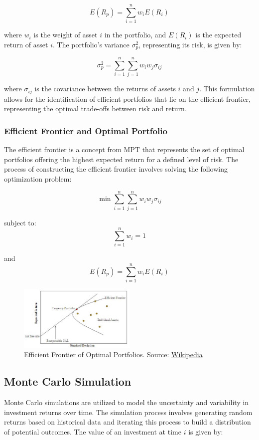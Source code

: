 \[
E(R_p) = \sum_{i=1}^{n} w_i E(R_i)
\]

where \( w_i \) is the weight of asset \( i \) in the portfolio, and \( E(R_i) \) is the expected return of asset \( i \). The portfolio’s variance \( \sigma^2_p \), representing its risk, is given by:

\[
\sigma^2_p = \sum_{i=1}^{n} \sum_{j=1}^{n} w_i w_j \sigma_{ij}
\]

where \( \sigma_{ij} \) is the covariance between the returns of assets \( i \) and \( j \). This formulation allows for the identification of efficient portfolios that lie on the efficient frontier, representing the optimal trade-offs between risk and return.

\subsubsection{Efficient Frontier and Optimal Portfolio}
The efficient frontier is a concept from MPT that represents the set of optimal portfolios offering the highest expected return for a defined level of risk. The process of constructing the efficient frontier involves solving the following optimization problem:

\[
\min \sum_{i=1}^{n} \sum_{j=1}^{n} w_i w_j \sigma_{ij}
\]

subject to:
\[
\sum_{i=1}^{n} w_i = 1
\]

and
\[
E(R_p) = \sum_{i=1}^{n} w_i E(R_i)
\]

\begin{figure}[h]
\centering
\includegraphics[width=0.5\textwidth]{efficient_frontier.png} 
\caption{Efficient Frontier of Optimal Portfolios. Source: \href{https://en.wikipedia.org/wiki/Efficient_frontier}{Wikipedia}}
\label{fig:efficient_frontier}
\end{figure}


\subsection{Monte Carlo Simulation}
Monte Carlo simulations are utilized to model the uncertainty and variability in investment returns over time. The simulation process involves generating random returns based on historical data and iterating this process to build a distribution of potential outcomes. The value of an investment at time \( i \) is given by:

